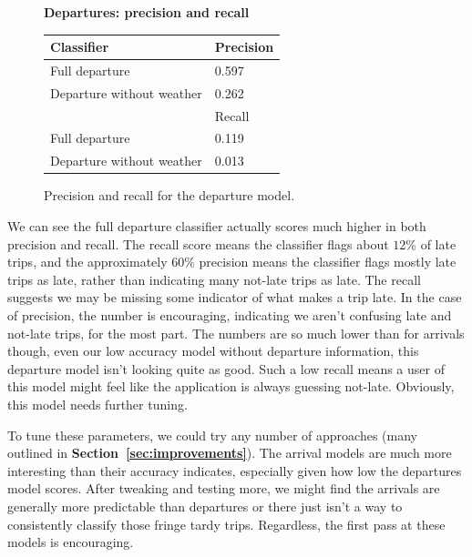 \documentclass[11pt]{article} %
\begin{document}
\begin{figure}
    \textbf{Departures: precision and recall}

    \begin{tabular}{l|l}
         Classifier & Precision\\
         \hline
         Full departure & 0.597\\
         Departure without weather & 0.262\\
         \hline
         & Recall\\
         \hline
         Full departure & 0.119\\
         Departure without weather & 0.013\\
    \end{tabular}
    \caption{Precision and recall for the departure model.}
    \label{fig:pr_departures}
\end{figure}

We can see the full departure classifier actually scores much higher in
both precision and recall. The recall score means the classifier flags about 
$12\%$ of late trips, and the approximately $60\%$ precision means the classifier
flags mostly late trips as late, rather than indicating many not-late trips
as late. The recall suggests we may be missing some indicator of what makes a 
trip late. In the case of precision, the number is encouraging, indicating we 
aren't confusing late and not-late trips, for the most part. The numbers are so
much lower than for arrivals though, even our low accuracy model without departure
information, this departure model isn't looking quite as good. Such a low 
recall means a user of this model might feel like the application is always 
guessing not-late. Obviously, this model needs further tuning.

To tune these parameters, we could try any number of approaches (many outlined in
\textbf{Section~\ref{sec:improvements}}). The arrival models are much more 
interesting than their accuracy indicates, especially given how low the 
departures model scores. After tweaking and testing more, we might find the
arrivals are generally more predictable than departures or there just isn't
a way to consistently classify those fringe tardy trips. Regardless, the first
pass at these models is encouraging.
\end{document}
